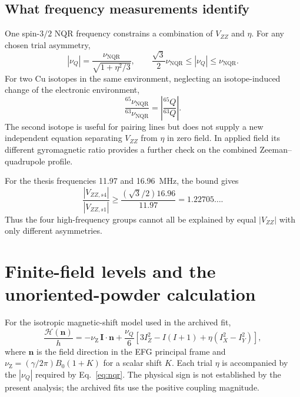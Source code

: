 \documentclass[11pt,a4paper]{article}
\newcommand{\nvec}{\bm n}
\newcommand{\nuq}{\nu_Q}
\newcommand{\nunqr}{\nu_{\mathrm{NQR}}}
\newcommand{\nuz}{\nu_{\mathrm Z}}
\begin{document}
\subsection{What frequency measurements identify}

One spin-$3/2$ NQR frequency constrains a combination of $V_{ZZ}$ and $\eta$.
For any chosen trial asymmetry,
\begin{equation}
 |\nuq|=\frac{\nunqr}{\sqrt{1+\eta^2/3}},\qquad
 \frac{\sqrt3}{2}\nunqr\leq|\nuq|\leq\nunqr.
\end{equation}
For two Cu isotopes in the same environment, neglecting an isotope-induced
change of the electronic environment,
\begin{equation}
 \frac{{}^{65}\nunqr}{{}^{63}\nunqr}
 =\left|\frac{{}^{65}Q}{{}^{63}Q}\right|.
\end{equation}
The second isotope is useful for pairing lines but does not supply a new
independent equation separating $V_{ZZ}$ from $\eta$ in zero field. In applied
field its different gyromagnetic ratio provides a further check on the combined
Zeeman--quadrupole profile.

For the thesis frequencies 11.97 and 16.96~MHz, the bound gives
\begin{equation}
 \frac{|V_{ZZ,s4}|}{|V_{ZZ,s1}|}
 \geq\frac{(\sqrt3/2)16.96}{11.97}=1.22705\ldots.
\end{equation}
Thus the four high-frequency groups cannot all be explained by equal
$|V_{ZZ}|$ with only different asymmetries.

\section{Finite-field levels and the unoriented-powder calculation}

For the isotropic magnetic-shift model used in the archived fit,
\begin{equation}
 \frac{\mathcal H(\nvec)}h=-\nuz\,\bm I\cdot\nvec
 +\frac{\nuq}{6}
 [3I_Z^2-I(I+1)+\eta(I_X^2-I_Y^2)],
\label{eq:fullH}
\end{equation}
where $\nvec$ is the field direction in the EFG principal frame and
$\nuz=(\gamma/2\pi)B_0(1+K)$ for a scalar shift $K$. Each trial $\eta$ is
accompanied by the $|\nuq|$ required by Eq.~\eqref{eq:nqr}. The physical sign is
not established by the present analysis; the archived fits use the positive
coupling magnitude.
\end{document}
